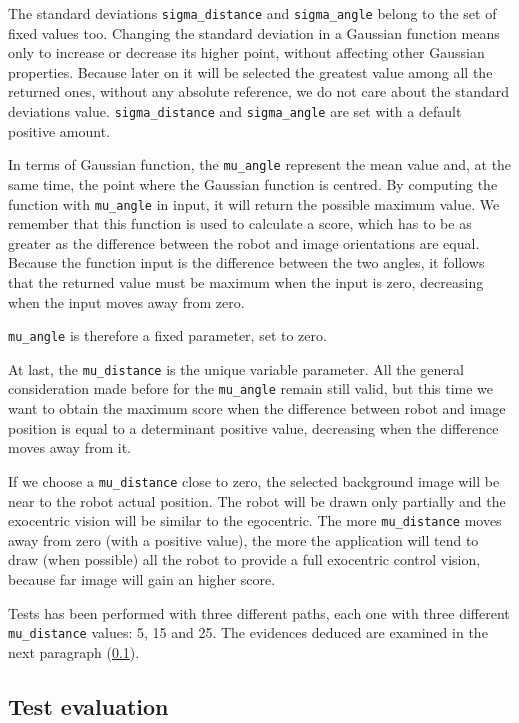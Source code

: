 %
The standard deviations \texttt{sigma\_distance} and \texttt{sigma\_angle} belong to the set of
fixed values too. Changing the standard deviation in a Gaussian function means only to increase or decrease its higher
point, without affecting other Gaussian properties. Because later on it will be selected the greatest value among
all the returned ones, without any absolute reference, we do not care about the standard deviations value.
\texttt{sigma\_distance} and \texttt{sigma\_angle} are set with a default positive amount.
%

%
In terms of Gaussian function, the \texttt{mu\_angle} represent the mean value and, at the same time, the point where
the Gaussian function is centred. By computing the function with \texttt{mu\_angle} in input, it will return the possible
maximum value. We remember that this function is used to calculate a score, which has to be as greater as the difference
between the robot and image orientations are equal. Because the function input is the difference between the two angles, it
follows that the returned value must be maximum when the input is zero, decreasing when the input moves away from zero.
%

%
\texttt{mu\_angle} is therefore a fixed parameter, set to zero.
%

%
At last, the \texttt{mu\_distance} is the unique variable parameter. All the general consideration made before for the 
\texttt{mu\_angle} remain still valid, but this time we want to obtain the maximum score when the difference between
robot and image position is equal to a determinant positive value, decreasing when the difference moves away from it.
%

%
If we choose a \texttt{mu\_distance} close to zero, the selected background image will be near to the robot actual position.
The robot will be drawn only partially and the exocentric vision will be similar to the egocentric. The more
\texttt{mu\_distance} moves away from zero (with a positive value), the more the application will tend to draw
(when possible) all the robot to provide a full exocentric control vision, because far image will gain an higher score.
%

%
Tests has been performed with three different paths, each one with three different \texttt{mu\_distance} values: 5, 15
and 25. The evidences deduced are examined in the next paragraph (\ref{subsec:testevaluation}).

\subsection{Test evaluation}
\label{subsec:testevaluation}

